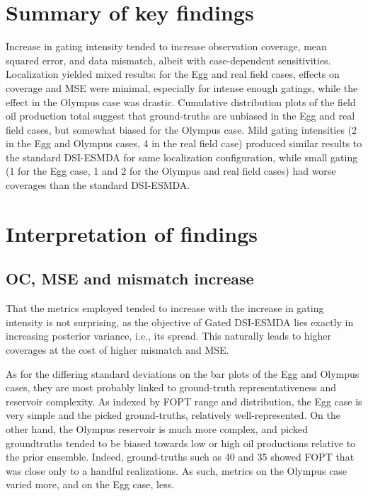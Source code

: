\section{Summary of key findings}
Increase in gating intensity tended to increase 
observation coverage, mean squared error, and data mismatch,
albeit with case-dependent sensitivities.
%
Localization yielded mixed results: for the Egg and real field cases,
effects on coverage and MSE were minimal, especially for intense enough gatings,
while the effect in the Olympus case was drastic.
%
Cumulative distribution plots of the field oil production total suggest 
that ground-truths are unbiased in the Egg and real field cases,
but somewhat biased for the Olympus case.
%
Mild gating intensities (2 in the Egg and Olympus cases, 4 in the real field case) produced similar results 
to the standard DSI-ESMDA for same localization configuration,
while small gating (1 for the Egg case, 1 and 2 for the Olympus and real field cases)
had worse coverages than the standard DSI-ESMDA.
 
\section{Interpretation of findings}

\subsection{OC, MSE and mismatch increase}
That the metrics employed tended to increase with the increase in gating intensity is not surprising,
as the objective of Gated DSI-ESMDA lies exactly in increasing posterior variance,
i.e., its spread.
%
This naturally leads to higher coverages at the cost of higher mismatch and MSE. 

As for the differing standard deviations on the bar plots of the Egg and Olympus cases,
they are most probably linked to ground-truth representativeness and reservoir complexity.
As indexed by FOPT range and distribution, 
the Egg case is very simple and the picked ground-truths, relatively well-represented.
On the other hand, the Olympus reservoir is much more complex, 
and picked groundtruths tended to be biased towards low or high oil productions relative to the prior ensemble.
Indeed, ground-truths such as 40 and 35 showed FOPT that was close only to a handful realizations.
As such, metrics on the Olympus case varied more, and on the Egg case, less. 


